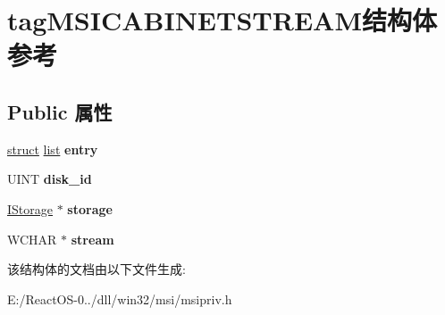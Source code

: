 \hypertarget{structtag_m_s_i_c_a_b_i_n_e_t_s_t_r_e_a_m}{}\section{tag\+M\+S\+I\+C\+A\+B\+I\+N\+E\+T\+S\+T\+R\+E\+A\+M结构体 参考}
\label{structtag_m_s_i_c_a_b_i_n_e_t_s_t_r_e_a_m}
\subsection*{Public 属性}
\begin{DoxyCompactItemize}
\item 
\mbox{\label{structtag_m_s_i_c_a_b_i_n_e_t_s_t_r_e_a_m_aa27ec92740c31cc34cd7f9e53128b55a}} 
\hyperlink{interfacestruct}{struct} \hyperlink{classlist}{list} {\bfseries entry}
\item 
\mbox{\label{structtag_m_s_i_c_a_b_i_n_e_t_s_t_r_e_a_m_a8bba546eaa594fb08a7587ab633561a9}} 
U\+I\+NT {\bfseries disk\+\_\+id}
\item 
\mbox{\label{structtag_m_s_i_c_a_b_i_n_e_t_s_t_r_e_a_m_ac19ac0588b0f69f5762154e70a06b91d}} 
\hyperlink{interface_i_storage}{I\+Storage} $\ast$ {\bfseries storage}
\item 
\mbox{\label{structtag_m_s_i_c_a_b_i_n_e_t_s_t_r_e_a_m_a76eaa6f9807632df132982f16dbfbddb}} 
W\+C\+H\+AR $\ast$ {\bfseries stream}
\end{DoxyCompactItemize}


该结构体的文档由以下文件生成\+:\begin{DoxyCompactItemize}
\item 
E\+:/\+React\+O\+S-\/0../dll/win32/msi/msipriv.\+h\end{DoxyCompactItemize}
